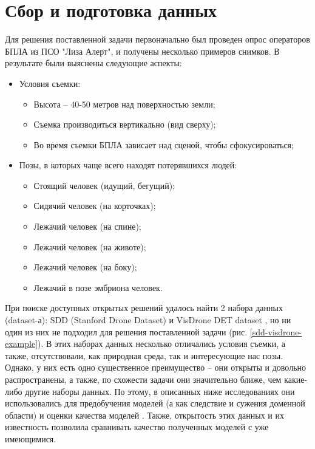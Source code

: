 \section{Сбор и подготовка данных}

Для решения поставленной задачи первоначально был проведен опрос операторов БПЛА из ПСО "Лиза Алерт", и получены несколько примеров снимков. В результате были выяснены следующие аспекты:

\begin{itemize}
    \item Условия съемки:
    \begin{itemize}
        \item Высота -- 40-50 метров над поверхностью земли;
        \item Съемка производиться вертикально (вид сверху);
        \item Во время съемки БПЛА зависает над сценой, чтобы сфокусироваться;
    \end{itemize}
    \item Позы, в которых чаще всего находят потерявшихся людей:
    \begin{itemize}
        \item Стоящий человек (идущий, бегущий);
        \item Сидячий человек (на корточках);
        \item Лежачий человек (на спине);
        \item Лежачий человек (на животе);
        \item Лежачий человек (на боку);
        \item Лежачий в позе эмбриона человек.
    \end{itemize}
\end{itemize}

При поиске доступных открытых решений удалось найти 2 набора данных (dataset-а): SDD (Stanford Drone Dataset) \cite{lib-sdd} и VisDrone DET dataset \cite{lib-visdrone}, но ни один из них не подходил для решения поставленной задачи (рис. \ref{sdd-visdrone-example}). В этих наборах данных несколько отличались условия съемки, а также, отсутствовали, как природная среда, так и интересующие нас позы. Однако, у них есть одно существенное преимущество -- они открыты и довольно распространены, а также, по схожести задачи они значительно ближе, чем какие-либо другие наборы данных. По этому, в описанных ниже исследованиях они использовались для предобучения моделей (а как следствие и сужения доменной области) и оценки качества моделей \cite{lib-transfer-learning}. Также, открытость этих данных и их известность позволила сравнивать качество полученных моделей с уже имеющимися.

